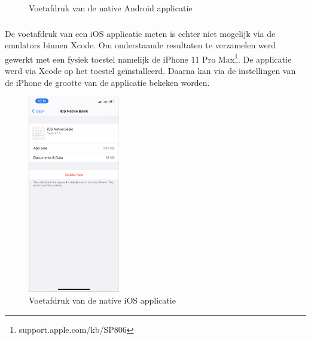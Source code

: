 \begin{figure}
    
    \caption{Voetafdruk van de native Android applicatie}
    \label{fig:M-voetafdruk-android}
\end{figure}


\subsubsection{}
\label{sec:M-test-voetafdruk-ios}
De voetafdruk van een iOS applicatie meten is echter niet mogelijk via de emulators binnen Xcode. Om onderstaande resultaten te verzamelen werd gewerkt met een fysiek toestel namelijk de iPhone 11 Pro Max\footnote{support.apple.com/kb/SP806}. De applicatie werd via Xcode op het toestel geïnstalleerd. Daarna kan via de instellingen van de iPhone de grootte van de applicatie bekeken worden.

\begin{figure}
    \centering
    \includegraphics[width=4cm]{img/voetafdruk-i-native}
    \caption{Voetafdruk van de native iOS applicatie}
    \label{fig:M-voetafdruk-ios}
\end{figure}


